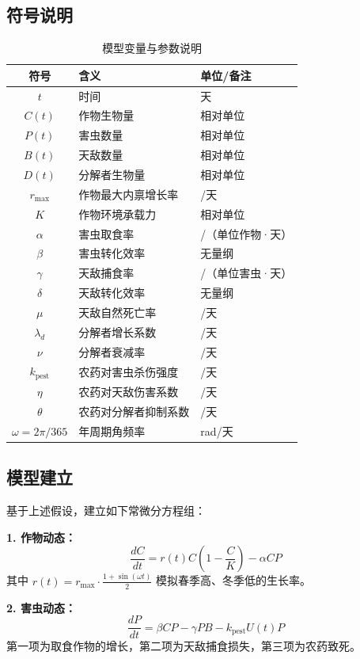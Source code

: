 \documentclass[12pt]{article}
\begin{document}
\subsection{符号说明}
\begin{table}[H]
\centering
\caption{模型变量与参数说明}
\label{tab:symbols}
\begin{tabular}{cll}
\toprule
符号 & 含义 & 单位/备注 \\
\midrule
$t$ & 时间 & 天 \\
$C(t)$ & 作物生物量 & 相对单位 \\
$P(t)$ & 害虫数量 & 相对单位 \\
$B(t)$ & 天敌数量 & 相对单位 \\
$D(t)$ & 分解者生物量 & 相对单位 \\
$r_{\max}$ & 作物最大内禀增长率 & /天 \\
$K$ & 作物环境承载力 & 相对单位 \\
$\alpha$ & 害虫取食率 & /（单位作物·天） \\
$\beta$ & 害虫转化效率 & 无量纲 \\
$\gamma$ & 天敌捕食率 & /（单位害虫·天） \\
$\delta$ & 天敌转化效率 & 无量纲 \\
$\mu$ & 天敌自然死亡率 & /天 \\
$\lambda_d$ & 分解者增长系数 & /天 \\
$\nu$ & 分解者衰减率 & /天 \\
$k_{\text{pest}}$ & 农药对害虫杀伤强度 & /天 \\
$\eta$ & 农药对天敌伤害系数 & /天 \\
$\theta$ & 农药对分解者抑制系数 & /天 \\
$\omega = 2\pi/365$ & 年周期角频率 & rad/天 \\
\bottomrule
\end{tabular}
\end{table}

\subsection{模型建立}
基于上述假设，建立如下常微分方程组：

\textbf{1. 作物动态：}
\[
\frac{dC}{dt} = r(t) C \left(1 - \frac{C}{K}\right) - \alpha C P
\]
其中 $r(t) = r_{\max} \cdot \frac{1 + \sin(\omega t)}{2}$ 模拟春季高、冬季低的生长率。

\textbf{2. 害虫动态：}
\[
\frac{dP}{dt} = \beta C P - \gamma P B - k_{\text{pest}} U(t) P
\]
第一项为取食作物的增长，第二项为天敌捕食损失，第三项为农药致死。
\end{document}
